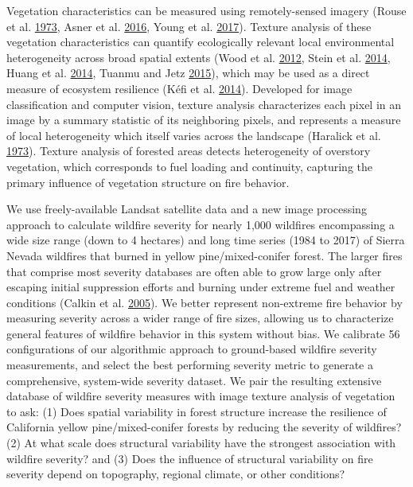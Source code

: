 \documentclass[twoside,12pt,final]{ucthesis-CA2012}
\begin{document}
\begin{ucmainmatter}
Vegetation characteristics can be measured using remotely-sensed imagery
(Rouse et al. \protect\hyperlink{ref-rouse1973}{1973}, Asner et al.
\protect\hyperlink{ref-asner2016}{2016}, Young et al.
\protect\hyperlink{ref-young2017}{2017}). Texture analysis of these
vegetation characteristics can quantify ecologically relevant local
environmental heterogeneity across broad spatial extents (Wood et al.
\protect\hyperlink{ref-wood2012}{2012}, Stein et al.
\protect\hyperlink{ref-stein2014}{2014}, Huang et al.
\protect\hyperlink{ref-huang2014}{2014}, Tuanmu and Jetz
\protect\hyperlink{ref-tuanmu2015}{2015}), which may be used as a direct
measure of ecosystem resilience (Kéfi et al.
\protect\hyperlink{ref-kefi2014}{2014}). Developed for image
classification and computer vision, texture analysis characterizes each
pixel in an image by a summary statistic of its neighboring pixels, and
represents a measure of local heterogeneity which itself varies across
the landscape (Haralick et al.
\protect\hyperlink{ref-haralick1973}{1973}). Texture analysis of
forested areas detects heterogeneity of overstory vegetation, which
corresponds to fuel loading and continuity, capturing the primary
influence of vegetation structure on fire behavior.

We use freely-available Landsat satellite data and a new image
processing approach to calculate wildfire severity for nearly 1,000
wildfires encompassing a wide size range (down to 4 hectares) and long
time series (1984 to 2017) of Sierra Nevada wildfires that burned in
yellow pine/mixed-conifer forest. The larger fires that comprise most
severity databases are often able to grow large only after escaping
initial suppression efforts and burning under extreme fuel and weather
conditions (Calkin et al. \protect\hyperlink{ref-calkin2005}{2005}). We
better represent non-extreme fire behavior by measuring severity across
a wider range of fire sizes, allowing us to characterize general
features of wildfire behavior in this system without bias. We calibrate
56 configurations of our algorithmic approach to ground-based wildfire
severity measurements, and select the best performing severity metric to
generate a comprehensive, system-wide severity dataset. We pair the
resulting extensive database of wildfire severity measures with image
texture analysis of vegetation to ask: (1) Does spatial variability in
forest structure increase the resilience of California yellow
pine/mixed-conifer forests by reducing the severity of wildfires? (2) At
what scale does structural variability have the strongest association
with wildfire severity? and (3) Does the influence of structural
variability on fire severity depend on topography, regional climate, or
other conditions?


\end{ucmainmatter}
\end{document}
